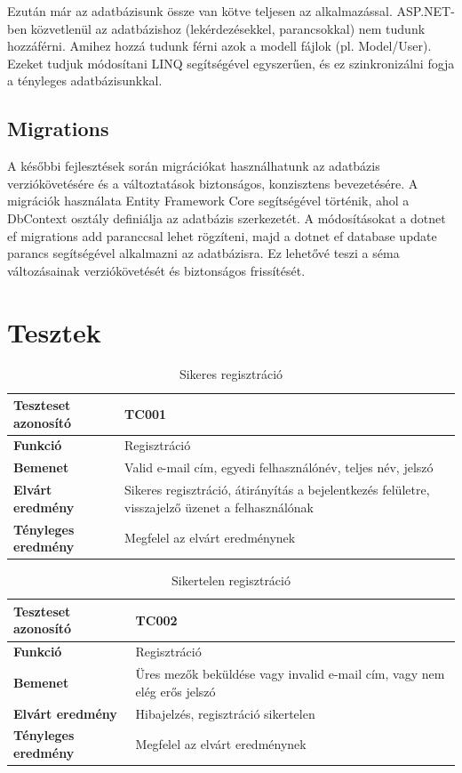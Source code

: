 Ezután már az adatbázisunk össze van kötve teljesen az alkalmazással. ASP.NET-ben közvetlenül az adatbázishoz (lekérdezésekkel, parancsokkal) nem tudunk hozzáférni. Amihez hozzá tudunk férni azok a modell fájlok (pl. Model/User). Ezeket tudjuk módosítani LINQ segítségével egyszerűen, és ez szinkronizálni fogja
a tényleges adatbázisunkkal.

\subsection{Migrations}
A későbbi fejlesztések során migrációkat használhatunk az adatbázis verziókövetésére és a változtatások biztonságos, konzisztens bevezetésére. A migrációk használata Entity Framework Core segítségével történik, ahol a DbContext osztály definiálja az adatbázis szerkezetét. A módosításokat a dotnet ef migrations add paranccsal lehet rögzíteni, majd a dotnet ef database update parancs segítségével alkalmazni az adatbázisra. Ez lehetővé teszi a séma változásainak verziókövetését és biztonságos frissítését.

\section{Tesztek}
\begin{table}[h!]
	\centering
	\begin{tabular}{|l|p{10cm}|}
		\hline
		\textbf{Teszteset azonosító} & TC001 \\ \hline
		\textbf{Funkció} & Regisztráció \\ \hline
		\textbf{Bemenet} & Valid e-mail cím, egyedi felhasználónév, teljes név, jelszó \\ \hline
		\textbf{Elvárt eredmény} & Sikeres regisztráció, átirányítás a bejelentkezés felületre, visszajelző üzenet a felhasználónak \\ \hline
		\textbf{Tényleges eredmény} & Megfelel az elvárt eredménynek\\ \hline
	\end{tabular}
	\caption{Sikeres regisztráció}
	\label{tab:manual_testcase_registration}
\end{table}
\begin{table}[h!]
	\centering
	\begin{tabular}{|l|p{10cm}|}
		\hline
		\textbf{Teszteset azonosító} & TC002 \\ \hline
		\textbf{Funkció} & Regisztráció \\ \hline
		\textbf{Bemenet} & Üres mezők beküldése vagy invalid e-mail cím, vagy nem elég erős jelszó \\ \hline
		\textbf{Elvárt eredmény} & Hibajelzés, regisztráció sikertelen \\ \hline
		\textbf{Tényleges eredmény} & Megfelel az elvárt eredménynek \\ \hline
	\end{tabular}
	\caption{Sikertelen regisztráció}
	\label{tab:regisztracio_ures}
\end{table}

